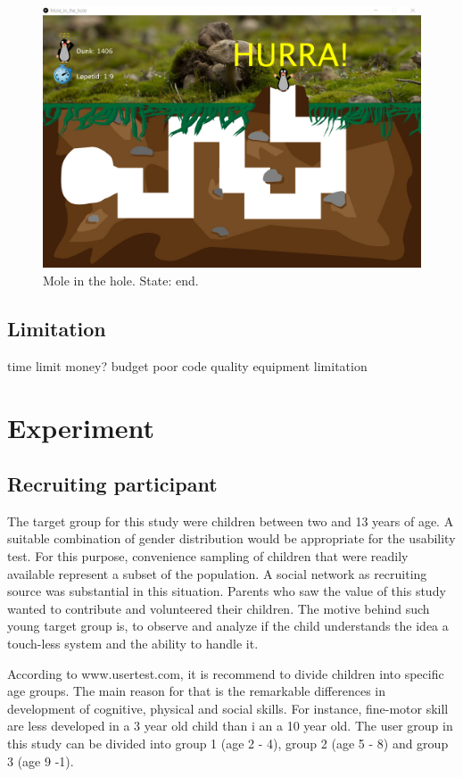 \begin{figure}[h]  %
  \centering
  \includegraphics[width=.5\textwidth]{figures/EndState_Mole_in_the_hole.png}
  \caption[Mole in the hole state end.]{Mole in the hole. State: end.}
  \label{fig:endState_Mole_in_the_hole}
\end{figure}



\subsection{Limitation}
time limit
money? budget
poor code quality
equipment limitation

\section{Experiment }
\label{sec:experiment}


\subsection{Recruiting participant}
\label{sec:participant}

The target group for this study were children between two and 13 years of age. A suitable combination of gender distribution would be appropriate for the usability test. For this purpose, convenience sampling of children that were readily available represent a subset of the population. A social network as recruiting source was substantial in this situation. Parents who saw the value of this study wanted to contribute and volunteered their children. 
The motive behind such young target group is, to observe and analyze if the child understands the idea a touch-less system and the ability to handle it. 

According to www.usertest.com, it is recommend to divide children into specific age groups. The main reason for that is the remarkable differences in development of cognitive, physical and social skills. For instance, fine-motor skill are less developed in a 3 year old child than i an a 10 year old. The user group in this study can be divided into group 1 (age 2 - 4), group 2 (age 5 - 8) and group 3 (age 9 -1).

